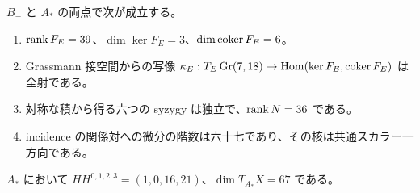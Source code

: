 \begin{proposition}[構成に必要な有限証明書]\label{prop:finite-incidence}
$B_-$ と $A_*$ の両点で次が成立する。
\begin{enumerate}
\item $\operatorname{rank} F_E=39$、$\dim\ker F_E=3$、$\dim\operatorname{coker} F_E=6$。
\item Grassmann 接空間からの写像
$\kappa_E:T_E\operatorname{Gr}(7,18)\to\operatorname{Hom}(\ker F_E,\operatorname{coker} F_E)$ は全射である。
\item 対称な積から得る六つの syzygy は独立で、$\operatorname{rank} N=36$ である。
\item incidence の関係対への微分の階数は六十七であり、その核は共通スカラー一方向である。
\end{enumerate}
$A_*$ において $HH^{0,1,2,3}=(1,0,16,21)$、$\dim T_{A_*}X=67$ である。
\end{proposition}
